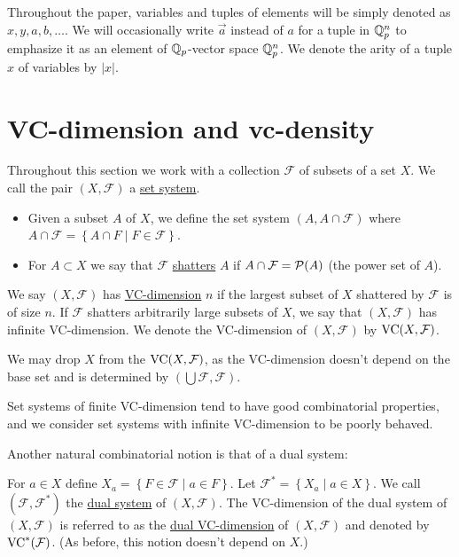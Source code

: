 \documentclass{amsart}
\newcommand{\F}{\mathcal F}
\newcommand{\curly}[1]{\left\{#1\right\}}
\newcommand{\defn}{\underline}
\begin{document}
Throughout the paper, variables and tuples of elements will be simply denoted as $x, y, a, b, \ldots$.
We will occasionally write $\vec a$ instead of $a$ for a tuple in $\mathbb{Q}_p^n$ to emphasize it as an element of $\mathbb{Q}_p$-vector space $\mathbb{Q}_p^n$.
We denote the arity of a tuple $x$ of variables by $|x|$.


\section{VC-dimension and vc-density}




  Throughout this section we work with a collection $\F$ of subsets of a set $X$.
  We call the pair $(X, \F)$ a \defn{set system}.

\begin{Definition}
  \begin{itemize}
  \item Given a subset $A$ of $X$, we define the set system $(A, A \cap \F)$
    where $A \cap \F = \curly{A \cap F \mid F\in \F}$.
  \item For $A \subset X$ we say that $\F$ \defn{shatters} $A$ if $A \cap \F = \PP(A)$ (the power set of $A$).
  \end{itemize}    
\end{Definition}  

\begin{Definition}
  We say $(X, \F)$ has \defn{VC-dimension} $n$ if the largest subset of $X$ shattered by $\F$ is of size $n$.
  If $\F$ shatters arbitrarily large subsets of $X$, we say that $(X, \F)$ has infinite VC-dimension.
  We denote the VC-dimension of $(X, \F)$ by $\VC(X, \F)$.
\end{Definition}  

\begin{Note}
  We may drop $X$ from the $\VC(X, \F)$, as the VC-dimension doesn't depend on the base set and is determined by $(\bigcup \F, \F)$.
\end{Note}
Set systems of finite VC-dimension tend to have good combinatorial properties,
and we consider set systems with infinite VC-dimension to be poorly behaved.

Another natural combinatorial notion is that of a dual system:
\begin{Definition}
  For $a \in X$ define $X_a = \curly{F \in \F \mid a \in F}$.
  Let $\F^* = \curly{X_a \mid a \in X}$.
  We call $(\F, \F^*)$ the \defn{dual system} of $(X, \F)$.
  The VC-dimension of the dual system of $(X, \F)$ is referred to as the \defn{dual VC-dimension} of $(X, \F)$ and denoted by $\VC^*(\F)$.
  (As before, this notion doesn't depend on $X$.)
\end{Definition}  
\end{document}
